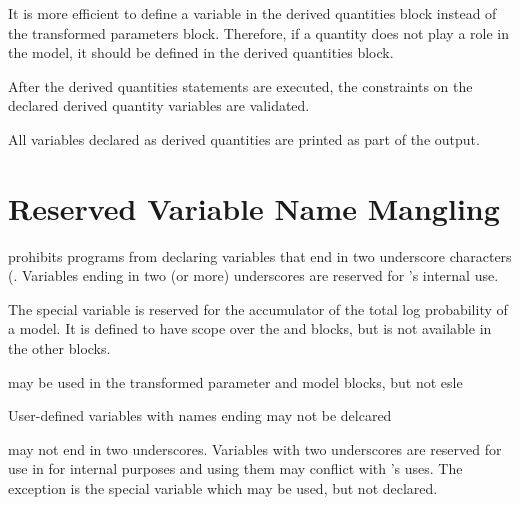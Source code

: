 It is more efficient to define a variable in the derived quantities
block instead of the transformed parameters block.  Therefore, if a
quantity does not play a role in the model, it should be defined in
the derived quantities block.  

After the derived quantities statements are executed, the constraints
on the declared derived quantity variables are validated.

All variables declared as derived quantities are printed as part of
the output. 









\section{Reserved Variable Name Mangling}

\Stan prohibits programs from declaring variables that end in two
underscore characters (\code{\_\_}.  Variables ending in two (or more)
underscores are reserved for \Stan's internal use.

The special variable  is reserved for the accumulator of
the total log probability of a model.  It is defined to have scope
over the  and  blocks, but is
not available in the other blocks.  

may be used in the transformed parameter and model blocks, but not
esle

User-defined variables with names ending may not be delcared

 may not end in two underscores.  Variables
with two underscores are reserved for use in \Stan for internal
purposes and using them may conflict with \Stan's uses.  The exception
is the special variable  which may be used, but not declared.
